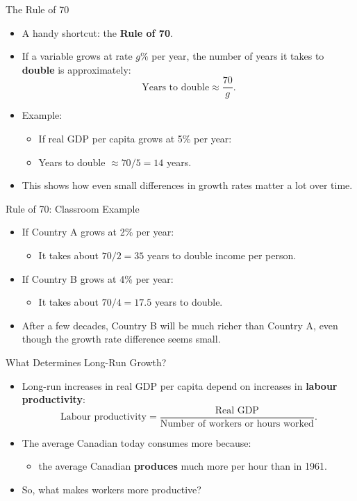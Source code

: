 \documentclass[aspectratio=169]{beamer}
\begin{document}
\begin{frame}{The Rule of 70}
\transfade
\begin{itemize}[<+->]
  \item A handy shortcut: the \textbf{Rule of 70}.
  \item If a variable grows at rate \(g\%\) per year, the number of years it takes to \textbf{double} is approximately:
  \[
    \text{Years to double} \approx \frac{70}{g}.
  \]
  \item Example:
  \begin{itemize}[<+->]
    \item If real GDP per capita grows at 5\% per year:
    \item Years to double \(\approx 70 / 5 = 14\) years.
  \end{itemize}
  \item This shows how even small differences in growth rates matter a lot over time.
\end{itemize}
\end{frame}

\begin{frame}{Rule of 70: Classroom Example}
\transfade
\begin{itemize}[<+->]
  \item If Country A grows at 2\% per year:
  \begin{itemize}[<+->]
    \item It takes about \(70/2 = 35\) years to double income per person.
  \end{itemize}
  \item If Country B grows at 4\% per year:
  \begin{itemize}[<+->]
    \item It takes about \(70/4 = 17.5\) years to double.
  \end{itemize}
  \item After a few decades, Country B will be much richer than Country A, even though the growth rate difference seems small.
\end{itemize}
\end{frame}


\begin{frame}{What Determines Long-Run Growth?}
\transfade
\begin{itemize}[<+->]
  \item Long-run increases in real GDP per capita depend on increases in \textbf{labour productivity}:
  \[
    \text{Labour productivity} =
    \frac{\text{Real GDP}}{\text{Number of workers or hours worked}}.
  \]
  \item The average Canadian today consumes more because:
  \begin{itemize}[<+->]
    \item the average Canadian \textbf{produces} much more per hour than in 1961.
  \end{itemize}
  \item So, what makes workers more productive?
\end{itemize}
\end{frame}
\end{document}
